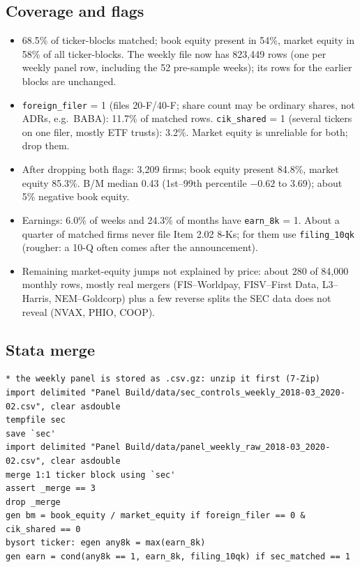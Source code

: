 \documentclass[11pt]{article}
\newcommand{\var}[1]{\texttt{#1}}
\begin{document}
\subsection{Coverage and flags}
\begin{itemize}
  \item 68.5\% of ticker-blocks matched; book equity present in 54\%, market equity in 58\% of all ticker-blocks. The weekly file now has 823,449 rows (one per weekly panel row, including the 52 pre-sample weeks); its rows for the earlier blocks are unchanged.
  \item \var{foreign\_filer} = 1 (files 20-F/40-F; share count may be ordinary shares, not ADRs, e.g.\ BABA): 11.7\% of matched rows. \var{cik\_shared} = 1 (several tickers on one filer, mostly ETF trusts): 3.2\%. Market equity is unreliable for both; drop them.
  \item After dropping both flags: 3,209 firms; book equity present 84.8\%, market equity 85.3\%. B/M median 0.43 (1st--99th percentile $-0.62$ to 3.69); about 5\% negative book equity.
  \item Earnings: 6.0\% of weeks and 24.3\% of months have \var{earn\_8k} = 1. About a quarter of matched firms never file Item 2.02 8-Ks; for them use \var{filing\_10qk} (rougher: a 10-Q often comes after the announcement).
  \item Remaining market-equity jumps not explained by price: about 280 of 84,000 monthly rows, mostly real mergers (FIS--Worldpay, FISV--First Data, L3--Harris, NEM--Goldcorp) plus a few reverse splits the SEC data does not reveal (NVAX, PHIO, COOP).
\end{itemize}

\subsection{Stata merge}
{\footnotesize
\begin{verbatim}
* the weekly panel is stored as .csv.gz: unzip it first (7-Zip)
import delimited "Panel Build/data/sec_controls_weekly_2018-03_2020-02.csv", clear asdouble
tempfile sec
save `sec'
import delimited "Panel Build/data/panel_weekly_raw_2018-03_2020-02.csv", clear asdouble
merge 1:1 ticker block using `sec'
assert _merge == 3
drop _merge
gen bm = book_equity / market_equity if foreign_filer == 0 & cik_shared == 0
bysort ticker: egen any8k = max(earn_8k)
gen earn = cond(any8k == 1, earn_8k, filing_10qk) if sec_matched == 1
\end{verbatim}
}
\end{document}
